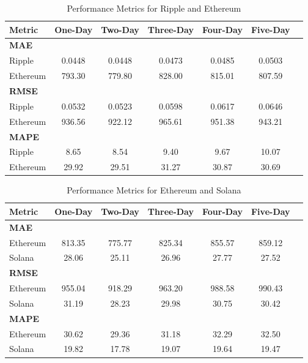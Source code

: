 \begin{table}[H]
\centering
\caption{Performance Metrics for Ripple and Ethereum}
\begin{tabular}{lcccccc}
\toprule
\textbf{Metric} & \textbf{One-Day} & \textbf{Two-Day} & \textbf{Three-Day} & \textbf{Four-Day} & \textbf{Five-Day} \\
\midrule
\textbf{MAE} & & & & & \\
Ripple        & 0.0448 & 0.0448 & 0.0473 & 0.0485 & 0.0503 \\
Ethereum      & 793.30 & 779.80 & 828.00 & 815.01 & 807.59 \\
\midrule
\textbf{RMSE} & & & & & \\
Ripple        & 0.0532 & 0.0523 & 0.0598 & 0.0617 & 0.0646 \\
Ethereum      & 936.56 & 922.12 & 965.61 & 951.38 & 943.21 \\
\midrule
\textbf{MAPE} & & & & & \\
Ripple        & 8.65 & 8.54 & 9.40 & 9.67 & 10.07 \\
Ethereum      & 29.92 & 29.51 & 31.27 & 30.87 & 30.69 \\
\bottomrule
\end{tabular}
\end{table}

\begin{table}[H]
\centering
\caption{Performance Metrics for Ethereum and Solana}
\begin{tabular}{lcccccc}
\toprule
\textbf{Metric} & \textbf{One-Day} & \textbf{Two-Day} & \textbf{Three-Day} & \textbf{Four-Day} & \textbf{Five-Day} \\
\midrule
\textbf{MAE} & & & & & \\
Ethereum      & 813.35 & 775.77 & 825.34 & 855.57 & 859.12 \\
Solana        & 28.06  & 25.11  & 26.96  & 27.77  & 27.52  \\
\midrule
\textbf{RMSE} & & & & & \\
Ethereum      & 955.04 & 918.29 & 963.20 & 988.58 & 990.43 \\
Solana        & 31.19  & 28.23  & 29.98  & 30.75  & 30.42  \\
\midrule
\textbf{MAPE} & & & & & \\
Ethereum      & 30.62  & 29.36  & 31.18  & 32.29  & 32.50  \\
Solana        & 19.82  & 17.78  & 19.07  & 19.64  & 19.47  \\
\bottomrule
\end{tabular}
\end{table}

